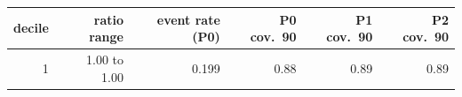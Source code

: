 \begin{tabular}{rrrrrr}
\toprule
decile & ratio range & event rate (P0) & P0 cov.\ 90 & P1 cov.\ 90 & P2 cov.\ 90 \\
\midrule
1 & 1.00 to 1.00 & 0.199 & 0.88 & 0.89 & 0.89 \\
\bottomrule
\end{tabular}
